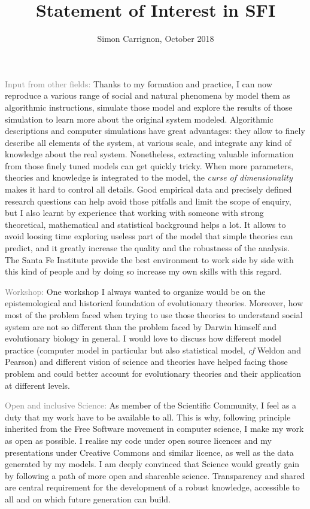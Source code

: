 \documentclass[10pt]{article}
\author{Simon Carrignon, October 2018}
\title{Statement of Interest in SFI}
\date{}
\begin{document}
\maketitle

\textcolor{grey}{Input from other fields:}  Thanks to my formation and practice, I can now reproduce a various range of social and natural  phenomena by model them as algorithmic instructions, simulate those model and explore the results of those simulation to learn more about the original system modeled.  
Algorithmic descriptions and computer simulations have great advantages: they allow to finely describe all elements of the system, at various scale, and integrate any kind of knowledge about the real system. Nonetheless, extracting valuable information from those finely tuned models can get quickly tricky. When more parameters, theories and knowledge is integrated to the model, the \emph{curse of dimensionality} makes it hard to control all details.  Good empirical data and precisely defined research questions can help avoid those pitfalls and limit the scope of enquiry, but I also learnt by experience that working with someone with strong theoretical, mathematical and statistical background helps a lot. It allows to avoid loosing time exploring useless part of the model that simple theories can predict, and it greatly increase the quality and the robustness of the analysis. The Santa Fe Institute provide the best environment to work side by side with this kind of people and by doing so increase my own  skills with this regard.

\vspace{.3cm}

\textcolor{grey}{Workshop:} One workshop I always wanted to organize would be on the epistemological and historical foundation of evolutionary theories. Moreover, how most of the problem faced when trying to use those theories to understand social system are not so different than the problem faced by Darwin himself and evolutionary biology in general.  I would love to discuss how different model practice (computer model in particular but also statistical model, \emph{cf} Weldon and Pearson) and different vision of science and theories have helped facing those problem and could better account for evolutionary theories and their application at different levels. 

\vspace{.3cm}

\textcolor{grey}{Open and inclusive Science:} As member of the Scientific Community, I feel as a duty that my work have to be available to all. This is why, following principle inherited from the Free Software movement in computer science, I make my work as open as possible. I realise my code under open source licences and my presentations under Creative Commons and similar licence, as well as the data generated by my models. I am deeply convinced that Science would greatly gain by following a path of more open and shareable science. Transparency and shared are central requirement for the development of a robust knowledge, accessible to all and on which future generation can build. 
\end{document}
